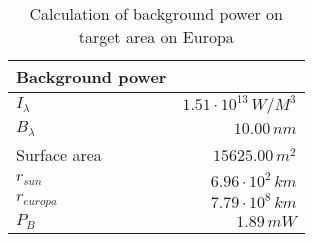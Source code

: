 \begin{table}[H]
\centering
\caption{Calculation of background power on target area on Europa}
\label{tab:background_power}
\begin{tabular}{|l|r|}\hline
    \textbf{Background power} & \\
    \hline 
    $I_\lambda$ & $1.51\cdot10^{13}\,W/M^3$ \\
    $B_\lambda$ & $10.00\,n m$ \\
    Surface area & $15625.00\, m^2$ \\
    $r_{sun}$ & $6.96\cdot10^{2}\,km$ \\
    $r_{europa}$ & $7.79\cdot10^{8}\,km$ \\
    $P_B$ & $1.89\,m W$ \\
    \hline 
\end{tabular}
\end{table}
